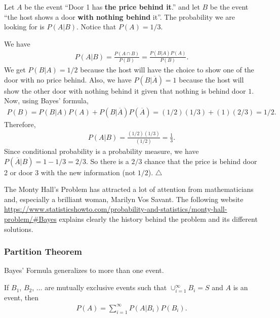 \begin{sol*}
Let $A$ be the event ``Door 1 has \textbf{the price behind it}.'' and let $B$ be the event ``the host shows a door \textbf{with nothing behind} it''. The probability we are looking for is $P (A | B)$. Notice that $P (A) = 1/3$.

We have
	\begin{align*}
	P (A |B) = \frac{P (A \cap B)}{P (B)} = \frac{P (B | A) P (A)}{P (B)} .
	\end{align*} 
We get $P (B |A) = 1 / 2$ because the host will have the choice to show one of the door with no price behind. Also, we have $P (B | \overline{A}) = 1$ because the host will show the other door with nothing behind it given that nothing is behind door $1$. Now, using Bayes' formula,
	\begin{align*}
	P (B) = P (B | A) P (A) + P (B |\overline{A}) P (\overline{A}) = (1/2) (1/3) + (1) (2/3) = 1/2 .
	\end{align*}
Therefore,
	\begin{align*}
	P (A | B) = \frac{(1/2) (1/3)}{(1/2)} = \frac{1}{3} .
	\end{align*}
Since conditional probability is a probability measure, we have $P (\overline{A} | B) = 1 - 1/3 = 2/3$. So there is a $2/3$ chance that the price is behind door 2 or door 3 with the new information (not $1/2$). \hfill $\triangle$
\end{sol*}

The Monty Hall's Problem has attracted a lot of attention from mathematicians and, especially a brilliant woman, Marilyn Vos Savant. The following website \url{https://www.statisticshowto.com/probability-and-statistics/monty-hall-problem/#Bayes} explains clearly the history behind the problem and its different solutions.

\subsubsection*{Partition Theorem}

Bayes' Formula generalizes to more than one event. 

\begin{theorem}
If $B_1$, $B_2$, $\ldots$ are mutually exclusive events such that $\cup_{i = 1}^\infty B_i = S$ and $A$ is an event, then
	\begin{align*}
	P (A) = \sum_{i = 1}^\infty P (A | B_i) P (B_i ) .
	\end{align*}
\end{theorem}

